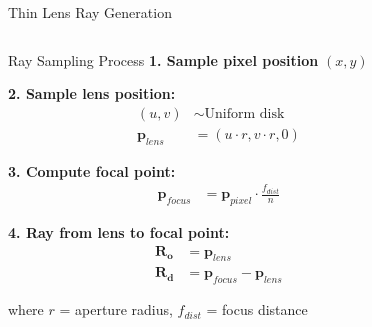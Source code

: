 \begin{frame}{Thin Lens Ray Generation}
    \begin{columns}
        \begin{column}{0.5\textwidth}
            \begin{mathbox}{Ray Sampling Process}
                \textbf{1. Sample pixel position} $(x, y)$
                
                \textbf{2. Sample lens position:}
                \begin{align}
                    (u, v) &\sim \text{Uniform disk}\\
                    \mathbf{p}_{lens} &= (u \cdot r, v \cdot r, 0)
                \end{align}
                
                \textbf{3. Compute focal point:}
                \begin{align}
                    \mathbf{p}_{focus} &= \mathbf{p}_{pixel} \cdot \frac{f_{dist}}{n}
                \end{align}
                
                \textbf{4. Ray from lens to focal point:}
                \begin{align}
                    \mathbf{R_o} &= \mathbf{p}_{lens}\\
                    \mathbf{R_d} &= \mathbf{p}_{focus} - \mathbf{p}_{lens}
                \end{align}
                
                where $r$ = aperture radius, $f_{dist}$ = focus distance
            \end{mathbox}
        \end{column}
        \begin{column}{0.5\textwidth}
\end{column}
\end{columns}
\end{frame}
